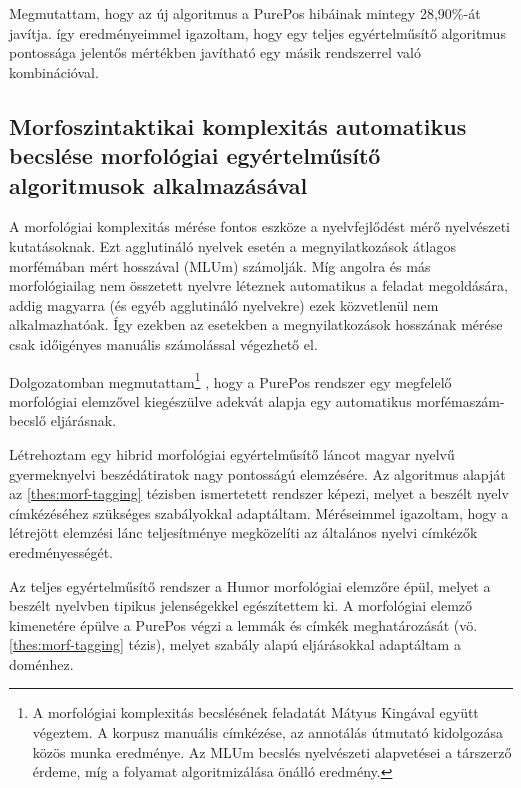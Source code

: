 Megmutattam, hogy az új algoritmus a PurePos hibáinak mintegy 28,90\%-át javítja. 
így eredményeimmel igazoltam, hogy egy teljes egyértelműsítő algoritmus pontossága jelentős mértékben javítható egy másik rendszerrel való kombinációval. 

\subsection{Morfoszintaktikai komplexitás automatikus becslése morfológiai egyértelműsítő algoritmusok alkalmazásával}
\label{thes:mlu}

A morfológiai komplexitás mérése fontos eszköze a nyelvfejlődést mérő nyelvészeti kutatásoknak.
Ezt agglutináló nyelvek esetén a megnyilatkozások átlagos morfémában mért hosszával (MLUm) számolják.
Míg angolra és más morfológiailag nem összetett nyelvre léteznek automatikus a feladat megoldására, addig magyarra (és egyéb agglutináló nyelvekre) ezek közvetlenül nem alkalmazhatóak. 
Így ezekben az esetekben a megnyilatkozások hosszának mérése csak időigényes manuális számolással végezhető el.

Dolgozatomban megmutattam\footnote{A morfológiai komplexitás becslésének feladatát Mátyus Kingával együtt végeztem. A korpusz manuális címkézése, az annotálás útmutató kidolgozása közös munka eredménye. Az MLUm becslés nyelvészeti alapvetései a társzerző érdeme, míg a folyamat algoritmizálása önálló eredmény.}
, hogy a PurePos rendszer egy megfelelő morfológiai elemzővel kiegészülve adekvát alapja egy automatikus morfémaszám-becslő eljárásnak. %

\begin{core}
\begin{thesis}
\label{thes:spoken-morf-tagging}
Létrehoztam egy  hibrid morfológiai egyértelműsítő láncot magyar nyelvű gyermeknyelvi beszédátiratok nagy pontosságú elemzésére. 
Az algoritmus alapját az \ref{thes:morf-tagging} tézisben ismertetett rendszer képezi, melyet a beszélt nyelv címkézéséhez szükséges szabályokkal adaptáltam. 
Méréseimmel igazoltam, hogy a létrejött elemzési lánc teljesítménye megközelíti az általános nyelvi címkézők eredményességét.
\end{thesis}

\begin{pub}
\cite{Matyus2014,Orosz2014c}
\end{pub}
\end{core}

Az teljes egyértelműsítő rendszer a Humor morfológiai elemzőre épül, melyet a beszélt nyelvben tipikus jelenségekkel egészítettem ki. 
A morfológiai elemző kimenetére épülve a PurePos végzi a lemmák és címkék meghatározását (vö. \ref{thes:morf-tagging} tézis), melyet szabály alapú eljárásokkal adaptáltam a doménhez.

